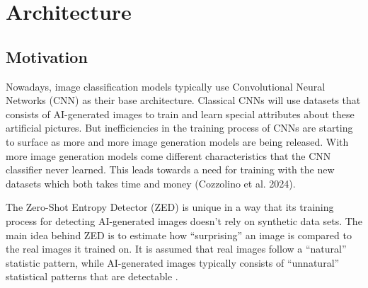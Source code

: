 \documentclass{article} %
\begin{document}
\section{Architecture}
\label{arch}
\subsection{Motivation}

Nowadays, image classification models typically use Convolutional Neural Networks (CNN) as their base architecture. Classical CNNs will use datasets that consists of AI-generated images to train and learn special attributes about these artificial pictures. But inefficiencies in the training process of CNNs are starting to surface as more and more image generation models are being released. With more image generation models come different characteristics that the CNN classifier never learned. This leads towards a need for training with the new datasets which both takes time and money (Cozzolino et al. 2024).


The Zero-Shot Entropy Detector (ZED) is unique in a way that its training process for detecting AI-generated images doesn't rely on synthetic data sets. The main idea behind ZED is to estimate how ``surprising'' an image is compared to the real images it trained on. It is assumed that real images follow a ``natural'' statistic pattern, while AI-generated images typically consists of “unnatural” statistical patterns that are detectable \citep{cozzolino2024zeroshotdetectionaigeneratedimages}.

\end{document}
